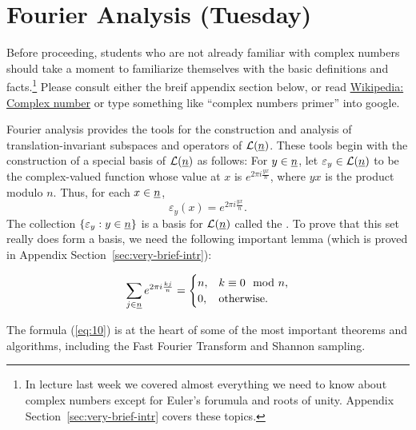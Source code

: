 \medskip

\part{Fourier Analysis (Tuesday)}
\label{part:four-analys-tuesd}
Before proceeding, students who are not already familiar with complex numbers should take a moment
to familiarize themselves with the basic definitions and facts.\footnote{In lecture last week
we covered almost everything we need to know about complex numbers except for Euler's forumula and
roots of unity.  Appendix Section~\ref{sec:very-brief-intr} covers these topics.}
Please consult either the breif appendix section below, or read
\href{https://en.wikipedia.org/wiki/Complex_number}{Wikipedia: Complex number} 
or type something like ``complex numbers primer'' into google.

Fourier analysis provides the tools for the construction and analysis of 
translation-invariant subspaces and operators of $\mathcal L(\underline{n})$.  
These tools begin
with the construction of a special basis of $\mathcal L(\underline{n})$ as follows:
For $y\in \underline{n}$, let $\varepsilon_y \in \mathcal L(\underline{n})$ to be the complex-valued function
whose value at $x$ is $e^{2\pi i \frac{yx}{n}}$, where $yx$ is the product
modulo $n$. Thus, for each $x\in \underline{n}$,
\[
\varepsilon_y(x) = e^{2\pi i \frac{yx}{n}}.
\]
The collection $\{\varepsilon_y : y \in \underline{n}\}$ is a basis for $\mathcal L(\underline{n})$ called the
.  To prove that this set really does form a basis, we
need the following important lemma (which is proved in Appendix Section~\ref{sec:very-brief-intr}):
\begin{lemma}
\label{lem:sum-roots-of-unity}
\begin{equation}
  \label{eq:10}
\sum_{j\in \underline{n}} e^{2\pi i \frac{kj}{n}} = 
\begin{cases}
  n, & k \equiv 0 \mod n,\\
  0, & \mathrm{ otherwise}.
\end{cases}
\end{equation}
\end{lemma}
The formula (\ref{eq:10}) is at the heart of some of the most 
important \dsp theorems and algorithms, including the Fast Fourier Transform and Shannon sampling.


